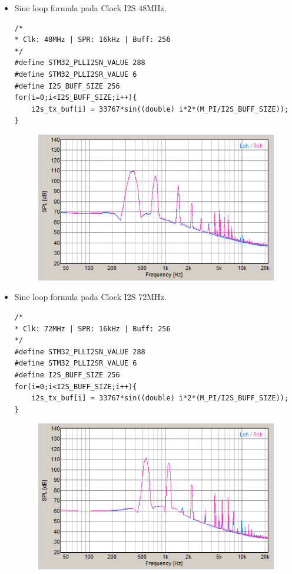 \documentclass[12pt,]{article}
\begin{document}
\begin{itemize}
\begin{itemize}
			\newpage
			\item Sine loop formula pada Clock I2S 48MHz.
			\begin{verbatim}
/*
* Clk: 48MHz | SPR: 16kHz | Buff: 256
*/
#define STM32_PLLI2SN_VALUE 288
#define STM32_PLLI2SR_VALUE 6
#define I2S_BUFF_SIZE 256	
for(i=0;i<I2S_BUFF_SIZE;i++){
	i2s_tx_buf[i] = 33767*sin((double) i*2*(M_PI/I2S_BUFF_SIZE));
}
			\end{verbatim}
			\begin{figure}[H]
				\centering
				\includegraphics[width=0.5\linewidth]{result/day_2/sine_clk48}
			\end{figure}
		
			\item Sine loop formula pada Clock I2S 72MHz.
			\begin{verbatim}
/*
* Clk: 72MHz | SPR: 16kHz | Buff: 256
*/
#define STM32_PLLI2SN_VALUE 288
#define STM32_PLLI2SR_VALUE 6
#define I2S_BUFF_SIZE 256	
for(i=0;i<I2S_BUFF_SIZE;i++){
	i2s_tx_buf[i] = 33767*sin((double) i*2*(M_PI/I2S_BUFF_SIZE));
}
			\end{verbatim}
			\begin{figure}[H]
				\centering
				\includegraphics[width=0.5\linewidth]{result/day_2/sine_clk72}
			\end{figure}
			

\end{itemize}
\end{itemize}
\end{document}
